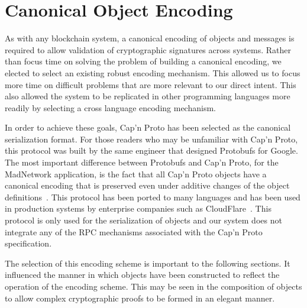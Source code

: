 \section{Canonical Object Encoding}

As with any blockchain system, a canonical encoding of objects and
messages is required to allow validation of cryptographic signatures
across systems.
Rather than focus time on solving the problem of building a canonical
encoding, we elected to select an existing robust encoding mechanism.
This allowed us to focus more time on difficult problems that are more
relevant to our direct intent.
This also allowed the system to be replicated in other programming
languages more readily by selecting a cross language encoding mechanism.

In order to achieve these goals, Cap'n Proto has been selected as the
canonical serialization format.
For those readers who may be unfamiliar with Cap'n Proto, this protocol
was built by the same engineer that designed Protobufs for Google.
The most important difference between Protobufs and Cap'n Proto, for
the MadNetwork application, is the fact that all Cap'n Proto objects
have a canonical encoding that is preserved even under additive changes
of the object definitions~\cite{CapnProto}.
This protocol has been ported to many languages and has been used in
production systems by enterprise companies such as
CloudFlare~\cite{CapnProtoNews}.
This protocol is only used for the serialization of objects and our
system does not integrate any of the RPC mechanisms associated with the
Cap'n Proto specification.

The selection of this encoding scheme is important to the following
sections.
It influenced the manner in which objects have been constructed to
reflect the operation of the encoding scheme.
This may be seen in the composition of objects to allow complex
cryptographic proofs to be formed in an elegant manner.
